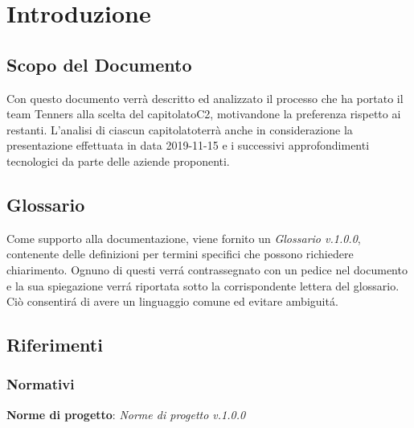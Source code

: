\section{Introduzione}

\subsection{Scopo del Documento}
Con questo documento verrà descritto ed analizzato il processo che ha portato il team Tenners alla scelta del capitolato\glo C2, motivandone la preferenza rispetto ai restanti. L'analisi di ciascun capitolato\glo terrà anche in considerazione la presentazione effettuata in data 2019-11-15 e i successivi approfondimenti tecnologici da parte delle aziende proponenti.
	
\subsection{Glossario}
Come supporto alla documentazione, viene fornito un \textit{Glossario v.1.0.0}, contenente delle definizioni per termini specifici che possono richiedere chiarimento. Ognuno di questi verr\'a contrassegnato con un pedice \glo nel documento e la sua spiegazione verr\'a riportata sotto la corrispondente lettera del glossario. Ci\`o consentir\'a di avere un linguaggio comune ed evitare ambiguit\'a. 
	
\subsection{Riferimenti}
\subsubsection{Normativi}
\textbf{Norme di progetto}: \textit{Norme di progetto v.1.0.0}

